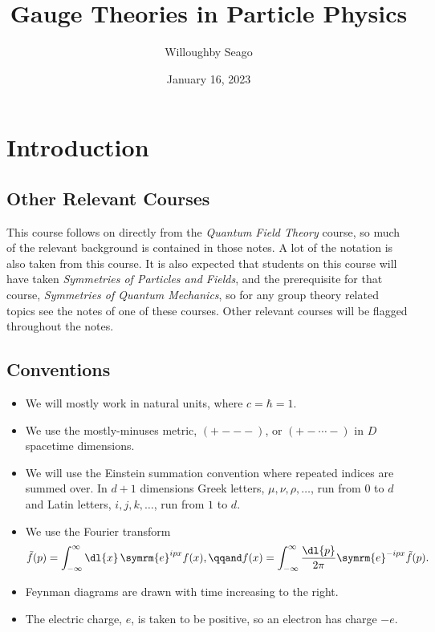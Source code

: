 \documentclass[fleqn]{NotesClass}
\title{Gauge Theories in Particle Physics}
\author{Willoughby Seago}
\date{January 16, 2023}
\newcommand*{\course}[1]{\textit{#1}}
\newcommand{\e}{\symrm{e}}
\begin{document}
    \frontmatter
    \titlepage
    \tableofcontents
    \listoffigures
    \mainmatter
    
    \chapter{Introduction}
    \section{Other Relevant Courses}
    This course follows on directly from the \course{Quantum Field Theory} course, so much of the relevant background is contained in those notes.
    A lot of the notation is also taken from this course.
    It is also expected that students on this course will have taken \course{Symmetries of Particles and Fields}, and the prerequisite for that course, \course{Symmetries of Quantum Mechanics}, so for any group theory related topics see the notes of one of these courses.
    Other relevant courses will be flagged throughout the notes.
    
    \section{Conventions}
    \begin{itemize}
        \item We will mostly work in natural units, where \(c = \hbar = 1\).
        \item We use the mostly-minuses metric, \(({+}{-}{-}{-})\), or \(({+}{-}\dotsb{-})\) in \(D\) spacetime dimensions.
        \item We will use the Einstein summation convention where repeated indices are summed over.
        In \(d + 1\) dimensions Greek letters, \(\mu, \nu, \rho, \dotsc\), run from 0 to \(d\) and Latin letters, \(i, j, k, \dotsc\), run from \(1\) to \(d\).
        \item We use the Fourier transform
        \begin{equation}
            \tilde{f}(p) = \int_{-\infty}^{\infty} \dl{x} \, \e^{ipx}f(x), \qqand f(x) = \int_{-\infty}^{\infty} \frac{\dl{p}}{2\pi} \e^{-ipx}\tilde{f}(p).
        \end{equation}
        \item Feynman diagrams are drawn with time increasing to the right.
        \item The electric charge, \(e\), is taken to be positive, so an electron has charge \(-e\).
    \end{itemize}
    
\end{document}
